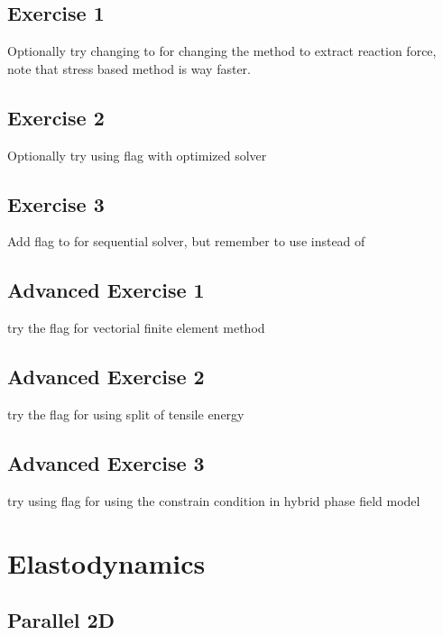 {{\subsection{Exercise 1}

Optionally try changing  to  for changing the method to extract reaction force, note that stress based method is way faster.

\subsection{Exercise 2}

Optionally try using   flag with  optimized solver

\subsection{Exercise 3}

Add  flag to  for sequential solver, but remember to use  instead of 

\subsection{Advanced Exercise 1}
try the  flag for vectorial finite element method

\subsection{Advanced Exercise 2}
try the  flag for using split of tensile energy

\subsection{Advanced Exercise 3}
try using  flag for using the constrain condition in hybrid phase field model

\pagebreak

\section{Elastodynamics}

\subsection{Parallel 2D}

}}

